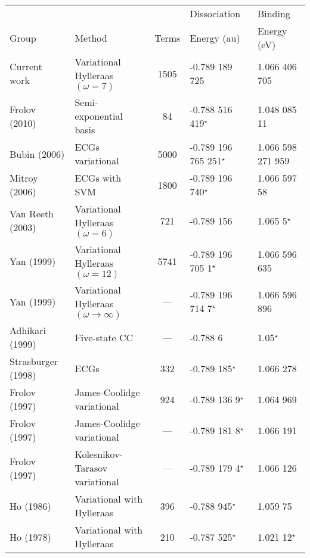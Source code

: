 \documentclass[Dissertation.tex]{subfiles}
\begin{document}
\begin{table}[H]
\footnotesize
\begin{center}
\begin{tabular}{l l c l l}
\toprule
\rowcolor{gray!25} & & & Dissociation & Binding\\
\rowcolor{gray!25}Group & Method & Terms & Energy (au) & Energy (eV)\\
\midrule
Current work & Variational Hylleraas $(\omega = 7)$ & 1505 & -0.789 189 725 & 1.066 406 705 \\
Frolov (2010) \cite{Frolov2010} & Semi-exponential basis & 84 & -0.788 516 419$^\star$ & 1.048 085 11 \\
Bubin (2006) \cite{Bubin2006} & ECGs variational & 5000 & -0.789 196 765 251$^\star$ & 1.066 598 271 959 \\
Mitroy (2006) \cite{Mitroy2006} & ECGs with SVM & 1800 & -0.789 196 740$^\star$ & 1.066 597 58 \\
Van Reeth (2003) \cite{VanReeth2003} & Variational Hylleraas $(\omega = 6)$ & 721 & -0.789 156 & 1.065 5$^\star$ \\
Yan (1999) \cite{Yan1999} & Variational Hylleraas $(\omega = 12)$ & 5741 & -0.789 196 705 1$^\star$ & 1.066 596 635 \\
Yan (1999) \cite{Yan1999} & Variational Hylleraas $(\omega \rightarrow \infty)$ & --- & -0.789 196 714 7$^\star$ & 1.066 596 896 \\
Adhikari (1999) \cite{Adhikari1999} & Five-state CC & --- & -0.788 6 & 1.05$^\star$ \\
Strasburger (1998) \cite{Strasburger1998} & ECGs & 332 & -0.789 185$^\star$ & 1.066 278 \\
Frolov (1997) \cite{Frolov1997a} & James-Coolidge variational & 924 & -0.789 136 9$^\star$ & 1.064 969 \\
Frolov (1997) \cite{Frolov1997a} & James-Coolidge variational & --- & -0.789 181 8$^\star$ & 1.066 191 \\
Frolov (1997) \cite{Frolov1997c} & Kolesnikov-Tarasov variational & --- & -0.789 179 4$^\star$ & 1.066 126 \\
Ho (1986) \cite{Ho1986} & Variational with Hylleraas & 396 & -0.788 945$^\star$ & 1.059 75 \\
Ho (1978) \cite{Ho1978} & Variational with Hylleraas & 210 & -0.787 525$^\star$ & 1.021 12$^\star$ \\

\end{tabular}
\end{center}
\end{table}
\end{document}
